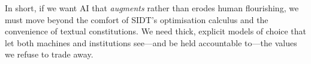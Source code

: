 In short, if we want AI that \textit{augments} rather than erodes human flourishing, we must move beyond the comfort of SIDT's optimisation calculus and the convenience of textual constitutions.  We need thick, explicit models of choice that let both machines and institutions see—and be held accountable to—the values we refuse to trade away.